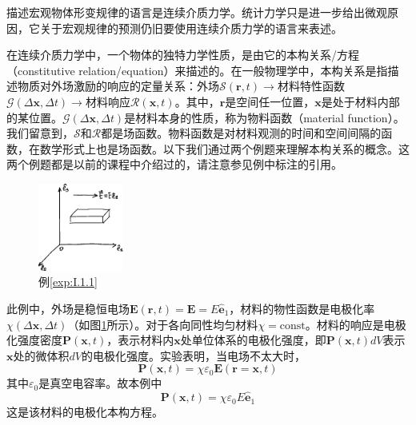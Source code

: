 \documentclass[main.tex]{subfiles}
\begin{document}
描述宏观物体形变规律的语言是连续介质力学。统计力学只是进一步给出微观原因，它关于宏观规律的预测仍旧要使用连续介质力学的语言来表述。

在连续介质力学中，一个物体的独特力学性质，是由它的本构关系/方程（constitutive relation/equation）来描述的。在一般物理学中，本构关系是指描述物质对外场激励的响应的定量关系：外场$\mathcal{S}\left(\mathbf{r},t\right)\rightarrow$材料特性函数$\mathcal{G}\left(\Delta\mathbf{x},\Delta t\right)\rightarrow$材料响应$\mathcal{R}\left(\mathbf{x},t\right)$。其中，$\mathbf{r}$是空间任一位置，$\mathbf{x}$是处于材料内部的某位置。$\mathcal{G}\left(\Delta\mathbf{x},\Delta t\right)$是材料本身的性质，称为物料函数（material function）。我们留意到，$\mathcal{S}$和$\mathcal{R}$都是场函数。物料函数是对材料观测的时间和空间间隔的函数，在数学形式上也是场函数\cite[\S~9.7,p.192]{华工高数2009下}。以下我们通过两个例题来理解本构关系的概念。这两个例题都是以前的课程中介绍过的，请注意参见例中标注的引用。

\begin{figure}[h]
\centering
\includegraphics[width=0.25\textwidth]{images/I.1.2.eps}
\caption{例\ref{exp:I.1.1}}
\label{fig:I.1.2}
\end{figure}

\begin{example}\label{exp:I.1.1}
此例中，外场是稳恒电场$\mathbf{E}\left(\mathbf{r},t\right)=\mathbf{E}=E\mathbf{\hat{e}}_1$，材料的物性函数是电极化率$\chi\left(\Delta\mathbf{x},\Delta t\right)$（如图\ref{fig:I.1.2}所示）。对于各向同性均匀材料$\chi=\text{const}$。材料的响应是电极化强度密度$\mathbf{P}\left(\mathbf{x},t\right)$，表示材料内$\mathbf{x}$处单位体系的电极化强度，即$\mathbf{P}\left(\mathbf{x},t\right)dV$表示$\mathbf{x}$处的微体积$dV$的电极化强度。实验表明，当电场不太大时\cite[\S18.2.3,p.~57]{邓文基2009大物下}，
\[
\mathbf{P}\left(\mathbf{x},t\right)=\chi\varepsilon_0\mathbf{E}\left(\mathbf{r}=\mathbf{x},t\right)
\]
其中$\varepsilon_0$是真空电容率。故本例中
\[
\mathbf{P}\left(\mathbf{x},t\right)=\chi\varepsilon_0 E\mathbf{\hat{e}}_1
\]
这是该材料的电极化本构方程。
\end{example}
\end{document}
